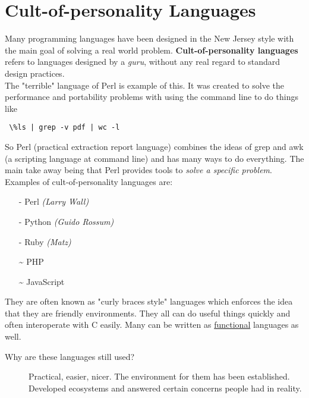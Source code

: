 \documentclass[twoside]{article}
\begin{document}
\section{Cult-of-personality Languages}
Many programming languages have been designed in the New Jersey style with the main goal of solving a real world problem. \textbf{Cult-of-personality languages}  refers to languages designed by a \emph{guru}, without any real regard to standard design practices.\\
 
\pagebreak
The "terrible" language of Perl is example of this. It was created to solve the performance and portability problems with using the command line to do things like \begin{verbatim} \%ls | grep -v pdf | wc -l \end{verbatim} So Perl (practical extraction report language) combines the ideas of grep and awk (a scripting language at command line) and has many ways to do everything. The main take away being that Perl provides tools to \emph{solve a specific problem}. Examples of cult-of-personality languages are:
\begin{itemize}
\item[-] Perl \emph{(Larry Wall)}
\item[-] Python \emph{(Guido Rossum)}
\item[-] Ruby \emph{(Matz)}
\item[\~{}] PHP
\item[\~{}] JavaScript
\end{itemize}
They are often known as "curly braces style" languages which enforces the idea that they are friendly environments. They all can do useful things quickly and often interoperate with C easily. Many can be written as \underline{functional} languages as well. 
\begin{description}
\item[Why are these languages still used?] Practical, easier, nicer. The environment for them has been established. Developed ecosystems and answered certain concerns people had in reality. 
\end{description}
\end{document}
